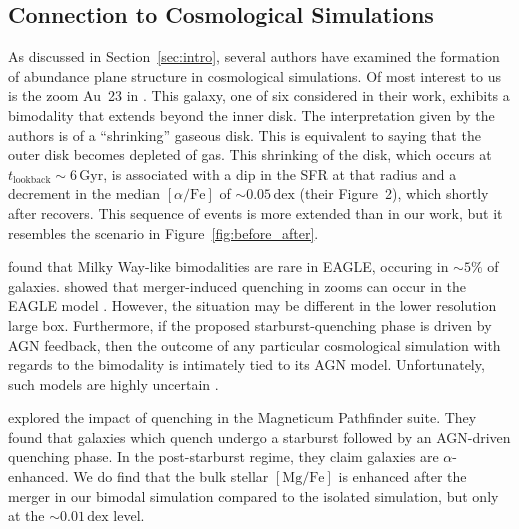 \documentclass[twocolumn,linenumbers,trackchanges]{aastex631}
\newcommand{\Gyr}{\ensuremath{\textrm{Gyr}}}
\newcommand{\MgFe}{\ensuremath{[\textrm{Mg}/\textrm{Fe}]}}
\newcommand{\alphaFe}{\ensuremath{[\alpha/\textrm{Fe}]}}
\newcommand{\dex}{\ensuremath{\textrm{dex}}}
\begin{document}

\subsection{Connection to Cosmological Simulations}\label{ssec:cosmo}
As discussed in Section~\ref{sec:intro}, several authors have examined the formation of abundance plane structure in cosmological simulations. Of most interest to us is the zoom Au~23 in \citet{2018MNRAS.474.3629G}. This galaxy, one of six considered in their work, exhibits a bimodality that extends beyond the inner disk. The interpretation given by the authors is of a ``shrinking'' gaseous disk. This is equivalent to saying that the outer disk becomes depleted of gas. This shrinking of the disk, which occurs at $t_{\textrm{lookback}}\sim6\,\Gyr$, is associated with a dip in the SFR at that radius and a decrement in the median \alphaFe{} of $\sim0.05\,\dex$ (their Figure~2), which shortly after recovers. This sequence of events is more extended than in our work, but it resembles the scenario in Figure~\ref{fig:before_after}.

\citet{2018MNRAS.477.5072M} found that Milky Way-like bimodalities are rare in EAGLE, occuring in $\sim5\%$ of galaxies. \citet{2021MNRAS.501..236D,2022MNRAS.515.1430D} showed that merger-induced quenching in zooms can occur in the EAGLE model \citep[see also][]{2017MNRAS.465..547P}. However, the situation may be different in the lower resolution large box. Furthermore, if the proposed starburst-quenching phase is driven by AGN feedback, then the outcome of any particular cosmological simulation with regards to the bimodality is intimately tied to its AGN model. Unfortunately, such models are highly uncertain \citep[e.g.][]{2022MNRAS.511.3751H}.

\citet{2023arXiv231016085K} explored the impact of quenching in the Magneticum Pathfinder suite. They found that galaxies which quench undergo a starburst followed by an AGN-driven quenching phase. In the post-starburst regime, they claim galaxies are $\alpha$-enhanced. We do find that the bulk stellar \MgFe{} is enhanced after the merger in our bimodal simulation compared to the isolated simulation, but only at the $\sim0.01\,\dex$ level.
\end{document}
